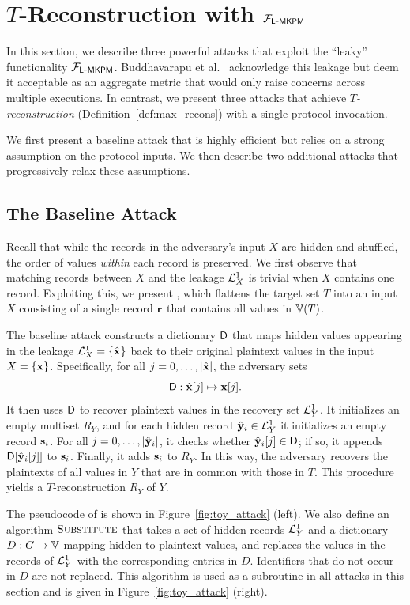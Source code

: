 \section{$T$-Reconstruction with $\mathcal{F}_{\mathsf{L\mbox{-}MKPM}}$}\label{sec:lmkpm-attacks}
In this section, we describe three powerful attacks that exploit the ``leaky''
functionality $\mathcal{F}_{\mathsf{L\mbox{-}MKPM}}$. Buddhavarapu et al.~\cite{MKPMC} acknowledge
this leakage but deem it acceptable as an aggregate metric that would only raise
concerns across multiple executions. In contrast, we present three attacks that
achieve \emph{$T$-reconstruction} (Definition~\ref{def:max_recons}) with a
single protocol invocation.

We first present a baseline attack that is highly efficient but relies on a
strong assumption on the protocol inputs. We then describe two additional
attacks that progressively relax these assumptions.

\subsection{The Baseline Attack}
\label{sec:baseline-attack}
Recall that while the records in the adversary's input $X$ are hidden and shuffled, the order of values \emph{within} each record is preserved.
We first observe that matching records between $X$ and the leakage $\mathcal{L}^{1}_X$ is trivial when $X$
contains one record. Exploiting this, we present \baselineattack{}, which
flattens the target set $T$ into an input $X$ consisting of a single record $\mathbf{r}$ that
contains all values in $\Ispace[T]$.

The baseline attack constructs a dictionary $\mathsf{D}$ that maps hidden values appearing in the leakage $\mathcal{L}^{1}_X = \{\hat{\mathbf{x}}\}$ back to their original plaintext values in the input $X = \{\mathbf{x}\}$. Specifically, for all $j = 0, \dots, |\hat{\mathbf{x}}|$, the adversary sets
\[
    \mathsf{D} : \hat{\mathbf{x}}[j] \mapsto \mathbf{x}[j].
\]
It then uses $\mathsf{D}$ to recover plaintext values in the recovery set
$\mathcal{L}^{1}_Y$. It initializes an empty multiset $R_Y$, and for each hidden record
$\hat{\mathbf{y}}_i \in \mathcal{L}^{1}_Y$ it initializes an empty record $\mathbf{s}_i$. For all
$j = 0, \dots, |\hat{\mathbf{y}}_i|$, it checks whether $\hat{\mathbf{y}}_i[j] \in \mathsf{D}$; if so, it
appends $\mathsf{D}[\hat{\mathbf{y}}_i[j]]$ to $\mathbf{s}_i$. Finally, it adds $\mathbf{s}_i$ to $R_Y$. In
this way, the adversary recovers the plaintexts of all values in $Y$ that are in
common with those in $T$. This procedure yields a $T$-reconstruction $R_Y$ of
$Y$.

The pseudocode of \baselineattack{} is shown in Figure~\ref{fig:toy_attack} (left).  
We also define an algorithm $\textsc{Substitute}$ that takes a set of hidden records $\mathcal{L}^1_Y$ and a dictionary $D: G \to \Ispace{}$ mapping hidden to plaintext values, and replaces the values in the records of $\mathcal{L}^1_Y$ with the corresponding entries in $D$. Identifiers that do not occur in $D$ are not replaced. This algorithm is used as a subroutine in all attacks in this section and is given in Figure~\ref{fig:toy_attack} (right).


